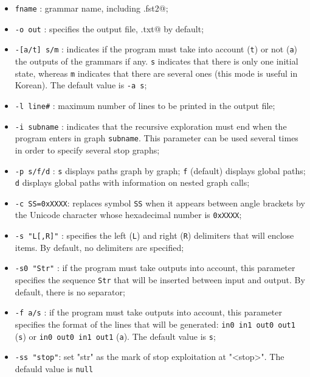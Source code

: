 \begin{itemize}
  \item \verb$fname$ : grammar name, including \verb@.fst2@;
  \item \verb$-o out$ : specifies the output file, \verb@lst.txt@ by default;
  \item \verb$-[a/t] s/m$ : indicates if the program must take into account
  (\verb$t$) or not (\verb$a$) the outputs of the grammars if any. \verb$s$
  indicates that there is only one initial state, whereas \verb$m$ indicates that
  there are several ones (this mode is useful in Korean). The default value is
  \verb$-a s$;

  \item \verb$-l line#$ : maximum number of lines to be printed in the output file;
  \item \verb$-i subname$ : indicates that the recursive exploration must end
  when the program enters in graph \verb$subname$. This parameter can be used
  several times in order to specify several stop graphs;

  \item \verb$-p s/f/d$ : \verb$s$ displays paths graph by graph; \verb$f$
  (default) displays global paths; \verb$d$ displays global paths with
  information on nested graph calls;

  \item \verb$-c SS=0xXXXX$: replaces symbol \verb$SS$ when it appears between
  angle brackets by the Unicode character whose hexadecimal number is
  \verb$0xXXXX$;

  \item \verb$-s "L[,R]"$ : specifies the left (\verb$L$) and right (\verb$R$)
  delimiters that will enclose items. By default, no delimiters are specified;

  \item \verb$-s0 "Str"$ : if the program must take  outputs into account, this
  parameter specifies the sequence \verb$Str$ that will be inserted between input
  and output. By default, there is no separator;

  \item \verb$-f a/s$ : if the program must take  outputs into account, this
  parameter specifies the format of the lines that will be generated:
  \verb$in0 in1 out0 out1$ (\verb$s$) or \verb$in0 out0 in1 out1$ (\verb$a$). The default
  value is \verb$s$;
  
  \item \verb$-ss "stop"$: set "str" as the mark of stop exploitation at "<stop>".
  The defauld value is \verb$null$


\end{itemize}
